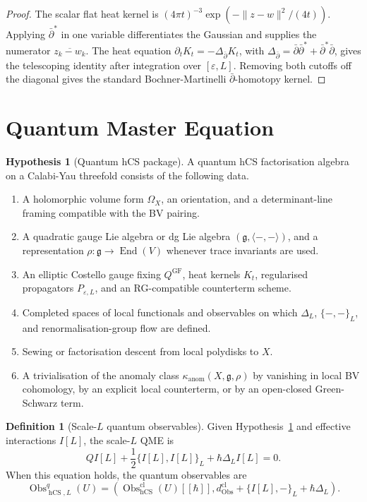 \documentclass[11pt]{amsart}
\providecommand{\dbar}{\bar{\partial}}
\providecommand{\dbarstar}{\bar{\partial}^{\ast}}
\providecommand{\fg}{\mathfrak{g}}
\providecommand{\End}{\operatorname{End}}
\providecommand{\Obs}{\operatorname{Obs}}
\providecommand{\hCS}{\operatorname{hCS}}
\providecommand{\kanom}{\kappa_{\operatorname{anom}}}
\theoremstyle{plain}
\theoremstyle{definition}
\newtheorem{definition}[theorem]{Definition}
\newtheorem{hypothesis}[theorem]{Hypothesis}
\theoremstyle{remark}
\begin{document}
\begin{proof}
The scalar flat heat kernel is
\((4\pi t)^{-3}\exp(-\|z-w\|^2/(4t))\). Applying \(\dbarstar\) in one
variable differentiates the Gaussian and supplies the numerator
\(\overline{z_k-w_k}\). The heat equation
\(\partial_tK_t=-\Delta_{\dbar}K_t\), with
\(\Delta_{\dbar}=\dbar\dbarstar+\dbarstar\dbar\), gives the telescoping
identity after integration over \([\varepsilon,L]\). Removing both
cutoffs off the diagonal gives the standard Bochner-Martinelli
\(\dbar\)-homotopy kernel.
\end{proof}

\section{Quantum Master Equation}
\label{sec:qme}

\begin{hypothesis}[Quantum hCS package]
\label{hyp:quantum-hcs-package}
A quantum hCS factorisation algebra on a Calabi-Yau threefold consists
of the following data.
\begin{enumerate}
\item A holomorphic volume form \(\Omega_X\), an orientation, and a
determinant-line framing compatible with the BV pairing.
\item A quadratic gauge Lie algebra or dg Lie algebra
\((\fg,\langle-,-\rangle)\), and a representation
\(\rho:\fg\to\End(V)\) whenever trace invariants are used.
\item An elliptic Costello gauge fixing \(Q^{\mathrm{GF}}\), heat kernels
\(K_t\), regularised propagators \(P_{\varepsilon,L}\), and an
RG-compatible counterterm scheme.
\item Completed spaces of local functionals and observables on which
\(\Delta_L\), \(\{-,-\}_L\), and renormalisation-group flow are defined.
\item Sewing or factorisation descent from local polydisks to \(X\).
\item A trivialisation of the anomaly class \(\kanom(X,\fg,\rho)\) by
vanishing in local BV cohomology, by an explicit local counterterm, or
by an open-closed Green-Schwarz term.
\end{enumerate}
\end{hypothesis}

\begin{definition}[Scale-\(L\) quantum observables]
\label{def:quantum-observables}
Given Hypothesis~\ref{hyp:quantum-hcs-package} and effective
interactions \(I[L]\), the scale-\(L\) QME is
\[
  QI[L]+\frac12\{I[L],I[L]\}_L+\hbar\Delta_L I[L]=0 .
\]
When this equation holds, the quantum observables are
\[
  \Obs^q_{\hCS,L}(U)
  =
  \left(
    \Obs^{\mathrm{cl}}_{\hCS}(U)[[\hbar]],
    d_{\Obs}^{\mathrm{cl}}+\{I[L],-\}_L+\hbar\Delta_L
  \right).
\]
\end{definition}
\end{document}
